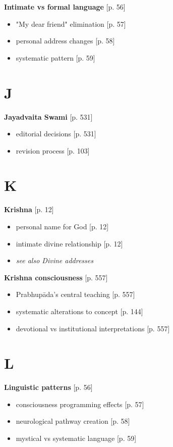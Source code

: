 \documentclass[11pt,twoside]{book}
\begin{document}
\textbf{\textbf{Intimate vs formal language}} {[}p. 56]
\begin{itemize}
\item "My dear friend" elimination [p. 57]
\item personal address changes [p. 58]
\item systematic pattern [p. 59]
\end{itemize}
\section*{J}
\label{sec:org26aa69f}

\textbf{\textbf{Jayadvaita Swami}} {[}p. 531]
\begin{itemize}
\item editorial decisions [p. 531]
\item revision process [p. 103]
\end{itemize}
\section*{K}
\label{sec:org5e5ba6f}

\textbf{\textbf{Krishna}} {[}p. 12]
\begin{itemize}
\item personal name for God [p. 12]
\item intimate divine relationship [p. 12]
\item \emph{see also Divine addresses}
\end{itemize}

\textbf{\textbf{Krishna consciousness}} {[}p. 557]
\begin{itemize}
\item Prabhupāda's central teaching [p. 557]
\item systematic alterations to concept [p. 144]
\item devotional vs institutional interpretations [p. 557]
\end{itemize}
\section*{L}
\label{sec:org61b5e97}

\textbf{\textbf{Linguistic patterns}} {[}p. 56]
\begin{itemize}
\item consciousness programming effects [p. 57]
\item neurological pathway creation [p. 58]
\item mystical vs systematic language [p. 59]
\end{itemize}
\end{document}
